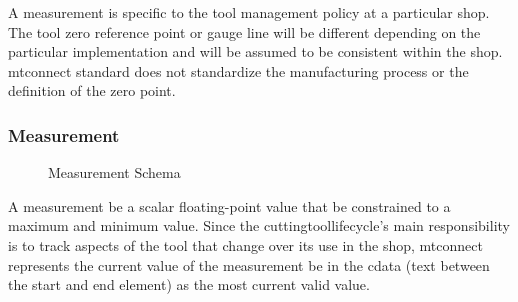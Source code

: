 A \gls{measurement} is specific to the tool management policy at a particular shop.  The tool zero reference point or gauge line will be different depending on the particular implementation and will be assumed to be consistent within the shop.  \gls{mtconnect standard} does not standardize the manufacturing process or the definition of the zero point. 

\pagebreak

\subsubsection{Measurement}

\begin{figure}[ht]
  \centering
  \caption{Measurement Schema}
  \label{fig:measurement-schema}
\end{figure}

\FloatBarrier

A \gls{measurement} \MUST be a scalar floating-point value that \MAY be constrained to a maximum and minimum value.  Since the \gls{cuttingtoollifecycle}’s main responsibility is to track aspects of the tool that change over its use in the shop, \gls{mtconnect} represents the current value of the \gls{measurement} \MUST be in the \gls{cdata} (text between the start and end element) as the most current valid value.


